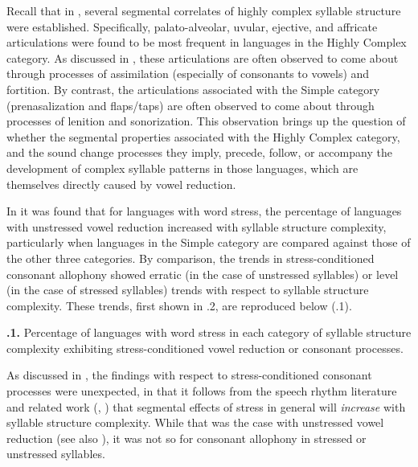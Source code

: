   Recall that in , several segmental correlates of highly complex syllable structure were established. Specifically, palato-alveolar, uvular, ejective, and affricate articulations were found to be most frequent in languages in the Highly Complex category. As discussed in , these articulations are often observed to come about through processes of assimilation (especially of consonants to vowels) and fortition. By contrast, the articulations associated with the Simple category (prenasalization and flaps/taps) are often observed to come about through processes of lenition and sonorization. This observation brings up the question of whether the segmental properties associated with the Highly Complex category, and the sound change processes they imply, precede, follow, or accompany the development of complex syllable patterns in those languages, which are themselves directly caused by vowel reduction.

  In  it was found that for languages with word stress, the percentage of languages with unstressed vowel reduction increased with syllable structure complexity, particularly when languages in the Simple category are compared against those of the other three categories. By comparison, the trends in stress-conditioned consonant allophony showed erratic (in the case of unstressed syllables) or level (in the case of stressed syllables) trends with respect to syllable structure complexity. These trends, first shown in .2, are reproduced below (.1).

\textbf{.1.} Percentage of languages with word stress in each category of syllable structure complexity exhibiting stress-conditioned vowel reduction or consonant processes.

As discussed in , the findings with respect to stress-conditioned consonant processes were unexpected, in that it follows from the speech rhythm literature and related work (\citealt{BybeeEtAl1998}, \citealt{Schiering2007}) that segmental effects of stress in general will \textit{increase} with syllable structure complexity. While that was the case with unstressed vowel reduction (see also ), it was not so for consonant allophony in stressed or unstressed syllables.

